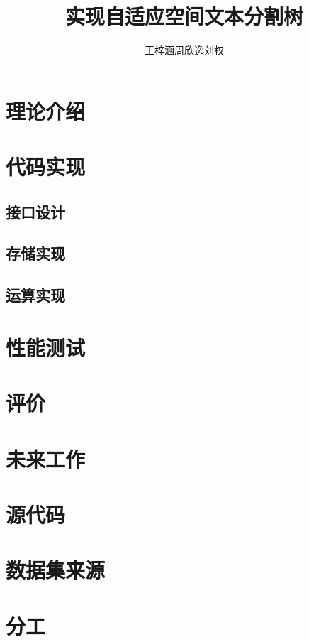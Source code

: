 \documentclass[UTF8]{ctexart}
\title{实现自适应空间文本分割树}
\author{王梓涵\quad 周欣逸\quad 刘权}
\date{}
\begin{document}
\maketitle

\linespread{0.5}
\setlength{\parskip}{0.5\baselineskip}

\section{理论介绍}

\section{代码实现}

\subsection{接口设计}

\subsection{存储实现}

\subsection{运算实现}

\section{性能测试}

\section{评价}

\section{未来工作}

\newpage

\renewcommand{\appendixname}{附录}
\begin{appendices}

\section{源代码}

\section{数据集来源}

\section{分工}

\end{appendices}
\end{document}
